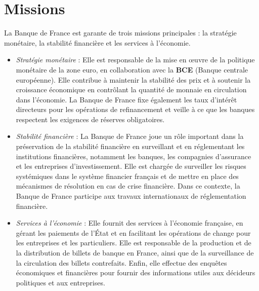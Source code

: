 \documentclass{report}
\begin{document}
\section{Missions}
La Banque de France est garante de trois missions principales : la stratégie monétaire, la stabilité financière et les services à l'économie.
\begin{itemize}
    \item \textit{Stratégie monétaire} : Elle est responsable de la mise en œuvre de la politique monétaire de la zone euro, en collaboration avec la \textbf{BCE} (Banque centrale européenne). Elle contribue à maintenir la stabilité des prix et à soutenir la croissance économique en contrôlant la quantité de monnaie en circulation dans l'économie. La Banque de France fixe également les taux d'intérêt directeurs pour les opérations de refinancement et veille à ce que les banques respectent les exigences de réserves obligatoires.
    \item \textit{Stabilité financière} : La Banque de France joue un rôle important dans la préservation de la stabilité financière en surveillant et en réglementant les institutions financières, notamment les banques, les compagnies d'assurance et les entreprises d'investissement. Elle est chargée de surveiller les risques systémiques dans le système financier français et de mettre en place des mécanismes de résolution en cas de crise financière. Dans ce contexte, la Banque de France participe aux travaux internationaux de réglementation financière.
    \item \textit{Services à l'économie} : Elle fournit des services à l'économie française, en gérant les paiements de l'État et en facilitant les opérations de change pour les entreprises et les particuliers. Elle est responsable de la production et de la distribution de billets de banque en France, ainsi que de la surveillance de la circulation des billets contrefaits. Enfin, elle effectue des enquêtes économiques et financières pour fournir des informations utiles aux décideurs politiques et aux entreprises.
\end{itemize}
\end{document}
